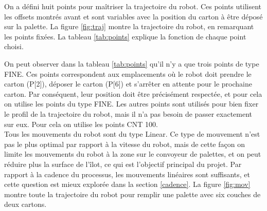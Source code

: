 On a défini huit points pour maîtriser la trajectoire du robot. Ces points utilisent les offsets montrés avant et sont variables avec la position du carton à être déposé sur la palette. La figure \ref{fig:traj} montre la trajectoire du robot, en remarquant les points fixées. La tableau \ref{tab:points} explique la fonction de chaque point choisi.\par
On peut observer dans la tableau \ref{tab:points} qu’il n’y a que trois points de type FINE. Ces points correspondent aux emplacements où le robot doit prendre le carton (P[2]), déposer le carton (P[6]) et s’arrêter en attente pour le prochaine carton. Par conséquent, leur position doit être précisément respectée, et pour cela on utilise les points du type FINE. Les autres points sont utilisés pour bien fixer le profil de la trajectoire du robot, mais il n’a pas besoin de passer exactement sur eux. Pour cela on utilise les points CNT 100.\\
Tous les mouvements du robot sont du type \flq{}Linear\frq{}. Ce type de mouvement n’est pas le plus optimal par rapport à la vitesse du robot, mais de cette façon on limite les mouvements du robot à la zone sur le convoyeur de palettes, et on peut réduire plus la surface de l'îlot, ce qui est l’objectif principal du projet. Par rapport à la cadence du processus, les mouvements linéaires sont suffisants, et cette question est mieux explorée dans la section \ref{cadence}.
La figure \ref{fig:mov} montre toute la trajectoire du robot pour remplir une palette avec six couches de deux cartons.
\pagebreak


